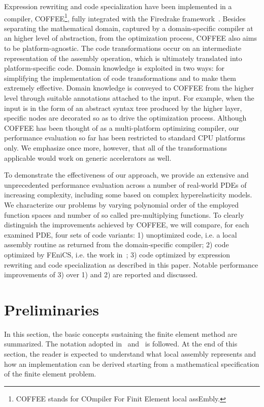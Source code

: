 Expression rewriting and code specialization have been implemented in a compiler, COFFEE\footnote{COFFEE stands for COmpiler For Finit Element local assEmbly.}, fully integrated with the Firedrake framework~\cite{Luporini}. Besides separating the mathematical domain, captured by a domain-specific compiler at an higher level of abstraction, from the optimization process, COFFEE also aims to be platform-agnostic. The code transformations occur on an intermediate representation of the assembly operation, which is ultimately translated into platform-specific code. Domain knowledge is exploited in two ways: for simplifying the implementation of code transformations and to make them extremely effective. Domain knowledge is conveyed to COFFEE from the higher level through suitable annotations attached to the input. For example, when the input is in the form of an abstract syntax tree produced by the higher layer, specific nodes are decorated so as to drive the optimization process. Although COFFEE has been thought of as a multi-platform optimizing compiler, our performance evaluation so far has been restricted to standard CPU platforms only. We emphasize once more, however, that all of the transformations applicable would work on generic accelerators as well.

To demonstrate the effectiveness of our approach, we provide an extensive and unprecedented performance evaluation across a number of real-world PDEs of increasing complexity, including some based on complex hyperelasticity models. We characterize our problems by varying polynomial order of the employed function spaces and number of so called pre-multiplying functions. To clearly distinguish the improvements achieved by COFFEE, we will compare, for each examined PDE, four sets of code variants: 1) unoptimized code, i.e. a local assembly routine as returned from the domain-specific compiler; 2) code optimized by FEniCS, i.e. the work in~\cite{quadrature-olegaard}; 3) code optimized by expression rewriting and code specialization as described in this paper. Notable performance improvements of 3) over 1) and 2) are reported and discussed.

\section{Preliminaries}
\label{sec:coffee-preliminaries}
In this section, the basic concepts sustaining the finite element method are summarized. The notation adopted in~\cite{quadrature-olegaard} and~\cite{francis} is followed. At the end of this section, the reader is expected to understand what local assembly represents and how an implementation can be derived starting from a mathematical specification of the finite element problem. 

